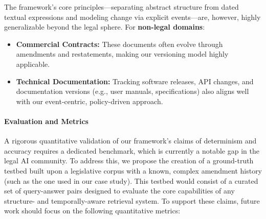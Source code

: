 \documentclass[11pt]{article}
\begin{document}
The framework's core principles—separating abstract structure from dated textual expressions and modeling change via explicit events—are, however, highly generalizable beyond the legal sphere. For \textbf{non-legal domains}:
\begin{itemize}[noitemsep, topsep=0pt]
    \item \textbf{Commercial Contracts:} These documents often evolve through amendments and restatements, making our versioning model highly applicable.
    \item \textbf{Technical Documentation:} Tracking software releases, API changes, and documentation versions (e.g., user manuals, specifications) also aligns well with our event-centric, policy-driven approach.
\end{itemize}

\paragraph{Evaluation and Metrics}
A rigorous quantitative validation of our framework's claims of determinism and accuracy requires a dedicated benchmark, which is currently a notable gap in the legal AI community. To address this, we propose the creation of a ground-truth testbed built upon a legislative corpus with a known, complex amendment history (such as the one used in our case study). This testbed would consist of a curated set of query-answer pairs designed to evaluate the core capabilities of any structure- and temporally-aware retrieval system. To support these claims, future work should focus on the following quantitative metrics:
\end{document}
